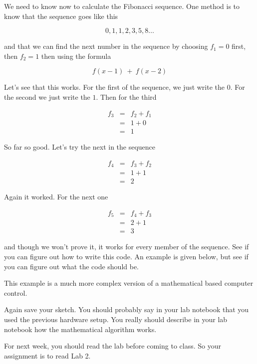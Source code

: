 We need to know now to calculate the Fibonacci sequence. One method is to
know that the sequence goes like this

\begin{equation*}
	0,1,1,2,3,5,8\ldots
\end{equation*}

and that we can find the next number in the sequence by choosing $f_{1}=0$
first, then $f_{2}=1$ then using the formula 

\begin{equation*}
	f(x-1)\ +\ f(x-2)
\end{equation*}

Let's see that this works. For the first of the sequence, we just write the $
0.$ For the second we just write the $1.$ Then for the third 

\begin{eqnarray*}
	f_{3} &=&f_{2}+f_{1} \\
	&=&1+0 \\
	&=&1
\end{eqnarray*}

So far so good. Let's try the next in the sequence

\begin{eqnarray*}
	f_{4} &=&f_{3}+f_{2} \\
	&=&1+1 \\
	&=&2
\end{eqnarray*}

Again it worked. For the next one

\begin{eqnarray*}
	f_{5} &=&f_{4}+f_{3} \\
	&=&2+1 \\
	&=&3
\end{eqnarray*}

and though we won't prove it, it works for every member of the sequence. See
if you can figure out how to write this code. An example is given below, but
see if you can figure out what the code should be.

This example is a much more complex version of a mathematical based computer
control.



Again save your sketch. You should probably say in your lab notebook that
you used the previous hardware setup. You really should describe in your lab
notebook how the mathematical algorithm works.

For next week, you should read the lab before coming to class. So your
assignment is to read Lab 2.

\vspace*{\fill}
\pagebreak
